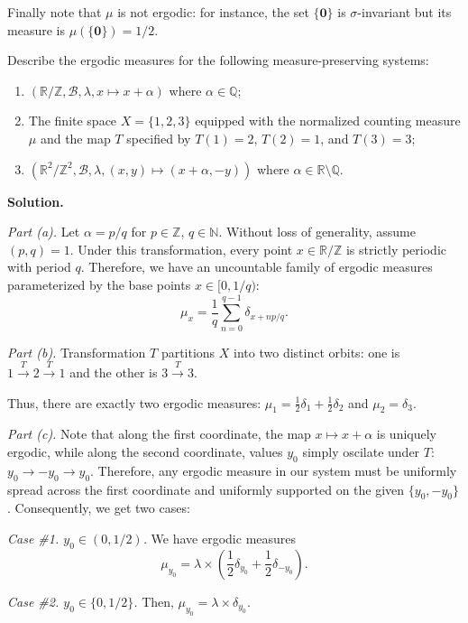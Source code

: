 \documentclass{template}
\begin{document}
Finally note that $\mu$ is not ergodic: for instance, the set $\{\mathbf{0}\}$ is $\sigma$-invariant
but its measure is $\mu(\{\mathbf{0}\}) = 1/2$. 

\begin{problem}[Exercise 5]
    Describe the ergodic measures for the following measure-preserving systems:
    \begin{enumerate}
        \item[(a)] $(\mathbb{R}/\mathbb{Z},\mathcal{B},\lambda,x \mapsto x+\alpha)$ where $\alpha \in \mathbb{Q}$;
        \item[(b)] The finite space $X=\{1,2,3\}$ equipped with the normalized counting measure $\mu$ and the map $T$ specified by $T(1)=2$, $T(2)=1$, and $T(3)=3$;
        \item[(c)] $(\mathbb{R}^2/\mathbb{Z}^2, \mathcal{B}, \lambda, (x,y) \mapsto (x+\alpha,-y))$ where $\alpha \in \mathbb{R} \setminus \mathbb{Q}$.
    \end{enumerate}
\end{problem}

\textbf{Solution.} 

\textit{Part (a).} Let $\alpha=p/q$ for $p \in \mathbb{Z}$, $q \in \mathbb{N}$.
Without loss of generality, assume $(p,q)=1$.
Under this transformation, every point $x \in \mathbb{R}/\mathbb{Z}$ is strictly
periodic with period $q$. Therefore, we have an uncountable family 
of ergodic measures parameterized by the base points $x \in [0,1/q)$:
\begin{equation*}
    \mu_x = \frac{1}{q}\sum_{n=0}^{q-1}\delta_{x+np/q}.
\end{equation*}

\textit{Part (b).} Transformation $T$ partitions $X$ into two
distinct orbits: one is $1 \xrightarrow{T} 2 \xrightarrow{T} 1$ and the other is $3 \xrightarrow{T} 3$. 

Thus, there are exactly two ergodic measures: $\mu_1 = \frac{1}{2}\delta_1 + \frac{1}{2}\delta_2$ and $\mu_2 = \delta_3$.

\textit{Part (c).} Note that along the first coordinate, the map $x \mapsto x+\alpha$
is uniquely ergodic, while along the second coordinate, values $y_0$ simply oscilate under $T$: $y_0 \to -y_0 \to y_0$.
Therefore, any ergodic measure in our system must be uniformly spread across the first coordinate
and uniformly supported on the given $\{y_0,-y_0\}$. Consequently, we get two cases:

\textit{Case \#1. $y_0 \in (0,1/2)$.} We have ergodic measures
\begin{equation*}
    \mu_{y_0} = \lambda \times \left(\frac{1}{2}\delta_{y_0} + \frac{1}{2}\delta_{-y_0}\right).
\end{equation*} 

\textit{Case \#2. $y_0 \in \{0,1/2\}$.} Then, $\mu_{y_0} = \lambda \times \delta_{y_0}$.

\nocite{*}
\renewcommand{\refname}{}


\end{document}
